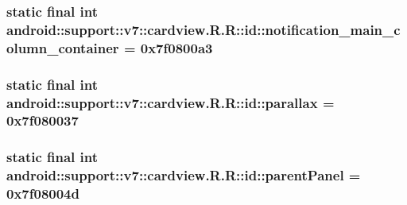\hypertarget{classandroid_1_1support_1_1v7_1_1cardview_1_1_r_1_1id_1114a8bfb6edada9c59d62159b059bb0}{
\subsubsection[{notification\_\-main\_\-column\_\-container}]{\setlength{\rightskip}{0pt plus 5cm}static final int android::support::v7::cardview.R.R::id::notification\_\-main\_\-column\_\-container = 0x7f0800a3}}
\label{classandroid_1_1support_1_1v7_1_1cardview_1_1_r_1_1id_1114a8bfb6edada9c59d62159b059bb0}


\hypertarget{classandroid_1_1support_1_1v7_1_1cardview_1_1_r_1_1id_ebb89e490892d7534c936bc653cbf49e}{
\subsubsection[{parallax}]{\setlength{\rightskip}{0pt plus 5cm}static final int android::support::v7::cardview.R.R::id::parallax = 0x7f080037}}
\label{classandroid_1_1support_1_1v7_1_1cardview_1_1_r_1_1id_ebb89e490892d7534c936bc653cbf49e}


\hypertarget{classandroid_1_1support_1_1v7_1_1cardview_1_1_r_1_1id_c26ad92c446d1434c2dc17dc82c661f8}{
\subsubsection[{parentPanel}]{\setlength{\rightskip}{0pt plus 5cm}static final int android::support::v7::cardview.R.R::id::parentPanel = 0x7f08004d}}
\label{classandroid_1_1support_1_1v7_1_1cardview_1_1_r_1_1id_c26ad92c446d1434c2dc17dc82c661f8}



